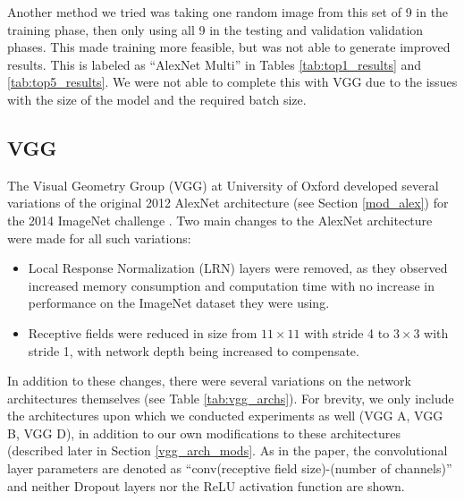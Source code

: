 \documentclass[10pt,twocolumn,letterpaper]{article}
\begin{document}
Another method we tried was taking one random image from this set of 9 in the training phase, then only using all 9 in the testing and validation validation phases. This made training more feasible, but was not able to generate improved results.  This is labeled as ``AlexNet Multi'' in Tables \ref{tab:top1_results} and \ref{tab:top5_results}.  We were not able to complete this with VGG due to the issues with the size of the model and the required batch size.

\subsection{VGG}
\label{vgg}

The Visual Geometry Group (VGG) at University of Oxford developed
several variations of the original 2012 AlexNet architecture
(see Section \ref{mod_alex}) for the 2014 ImageNet challenge
\cite{VGG}. Two main changes to the AlexNet architecture
were made for all such variations:
\begin{itemize}
\item Local Response Normalization (LRN) layers were removed, as
they observed increased memory consumption and computation time with
no increase in performance on the ImageNet dataset they were using.

\item Receptive fields were reduced in size from $11 \times 11$
with stride 4 to $3 \times 3$ with stride 1, with network depth
being increased to compensate.
\end{itemize}

In addition to these changes, there were several variations
on the network architectures themselves (see
Table \ref{tab:vgg_archs}). For brevity, we only
include the architectures upon which we conducted experiments
as well (VGG A, VGG B, VGG D), in addition to our own modifications
to these architectures (described later in
Section \ref{vgg_arch_mods}. As in the paper, the convolutional
layer parameters are denoted as
``conv(receptive field size)-(number of channels)'' and neither
Dropout layers nor the ReLU activation function are shown.
\end{document}
